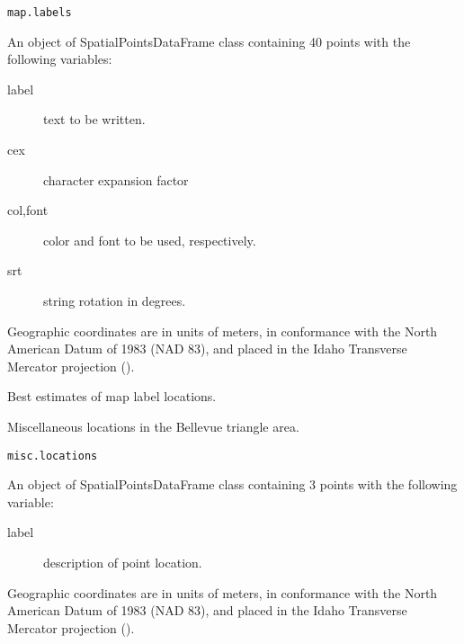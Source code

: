 \documentclass[a4paper]{book}
\begin{document}
%
\begin{Usage}
\begin{verbatim}
map.labels
\end{verbatim}
\end{Usage}
%
\begin{Format}
An object of SpatialPointsDataFrame class containing
40 points with the following variables:
\begin{description}

\item[label] text to be written.
\item[cex] character expansion factor
\item[col,font] color and font to be used, respectively.
\item[srt] string rotation in degrees.

\end{description}

Geographic coordinates are in units of meters, in conformance with the
North American Datum of 1983 (NAD 83), and placed in the
Idaho Transverse Mercator projection ().
\end{Format}
%
\begin{Source}\relax
Best estimates of map label locations.
\end{Source}
%
\begin{Examples}
\end{Examples}
%
\begin{Description}\relax
Miscellaneous locations in the Bellevue triangle area.
\end{Description}
%
\begin{Usage}
\begin{verbatim}
misc.locations
\end{verbatim}
\end{Usage}
%
\begin{Format}
An object of SpatialPointsDataFrame class containing 3 points
with the following variable:
\begin{description}

\item[label] description of point location.

\end{description}

Geographic coordinates are in units of meters, in conformance with the
North American Datum of 1983 (NAD 83), and placed in the
Idaho Transverse Mercator projection ().
\end{Format}
\end{document}
